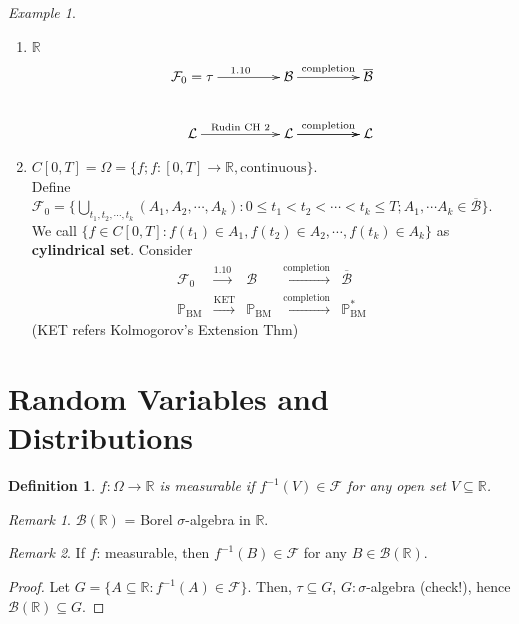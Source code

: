 \documentclass[12pt]{report}
\renewcommand{\1}{\mathbb{1}}
\renewcommand{\subset}{\subseteq}
\theoremstyle{break}
\theoremstyle{newdef}
\newtheorem{defn}[thm]{Definition} %
\theoremstyle{remark}
\newtheorem*{exmp}{Example} %
\newtheorem*{rem}{Remark} %
\begin{document}
\begin{exmp}
\leavevmode
\begin{enumerate}[label = \arabic*)]
\item $\mathbb{R}$
$$
\xymatrix@R+0.25em@C+2em{
\ar @{} [dr] |{}
\mathcal{F}_0 = \tau \ar[r]^{1.10} & \mathcal{B} \ar[r]^{\text{completion}} & \overline{\mathcal{B}}\\
\mathcal{L} \ar[r]^{\text{Rudin CH 2}} & \mathcal{L} \ar[r]^{\text{completion}} \ar[r] & \mathcal{L}
}
$$



\item $C[0,T] = \Omega = \{f ; f : [0,T] \rightarrow \mathbb{R}, \text{continuous}\}$.\\
Define $\mathcal{F}_0 = \{\bigcup_{t_1,t_2,\cdots,t_k}(A_1,A_2,\cdots,A_k)
: 0 \leq t_1 < t_2 < \cdots < t_k \leq T; A_1, \cdots A_k \in \overline{\mathcal{B}}
\}$.
We call $\{f \in C[0,T]: f(t_1) \in A_1, f(t_2) \in A_2, \cdots, f(t_k) \in A_k\}$ as \textbf{cylindrical set}.
Consider
$$
\begin{aligned}
\mathcal{F}_0 &\overset{1.10}{\longrightarrow} &\mathcal{B} &\overset{\text{completion}}{\longrightarrow} &\overline{\mathcal{B}}\\
\mathbb{P}_{\text{BM}} &\overset{\text{KET}}{\longrightarrow} &\mathbb{P}_{\text{BM}} &\overset{\text{completion}}{\longrightarrow} &\mathbb{P}^*_{\text{BM}}
\end{aligned}
$$
(KET refers Kolmogorov's Extension Thm)
\end{enumerate}
\end{exmp}

\section{Random Variables and Distributions}
\begin{defn}
$f : \Omega \rightarrow \mathbb{R}$ is measurable if $f^{-1}(V) \in \mathcal{F}$ for any open set $V \subset \mathbb{R}$.
\end{defn}

\begin{rem}
$\mathcal{B}(\mathbb{R})$ = Borel $\sigma$-algebra in $\mathbb{R}$.
\end{rem}

\begin{rem}
If $f$: measurable, then $f^{-1}(B) \in \mathcal{F}$ for any $B \in \mathcal{B}(\mathbb{R})$.
\begin{proof}
Let $G = \{ A \subset \mathbb{R} : f^{-1}(A) \in \mathcal{F} \}$.
Then, $\tau \subset G$, $G: \sigma$-algebra (check!), hence $\mathcal{B}(\mathbb{R}) \subset G$.
\end{proof}
\end{rem}
\end{document}
